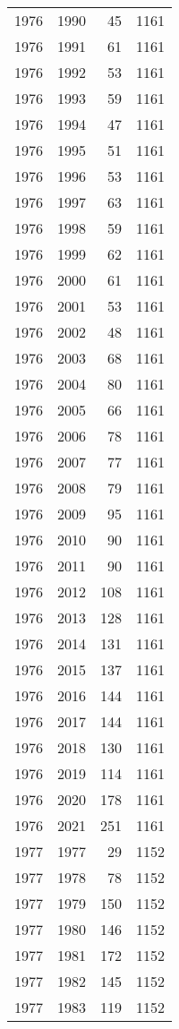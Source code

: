 \documentclass[
  10pt,
  letterpaper,
  DIV=11,
  numbers=noendperiod,
  twoside]{scrartcl}
\begin{document}
\begin{longtable}[]{@{}rrrr@{}}
1976 & 1990 & 45 & 1161 \\
1976 & 1991 & 61 & 1161 \\
1976 & 1992 & 53 & 1161 \\
1976 & 1993 & 59 & 1161 \\
1976 & 1994 & 47 & 1161 \\
1976 & 1995 & 51 & 1161 \\
1976 & 1996 & 53 & 1161 \\
1976 & 1997 & 63 & 1161 \\
1976 & 1998 & 59 & 1161 \\
1976 & 1999 & 62 & 1161 \\
1976 & 2000 & 61 & 1161 \\
1976 & 2001 & 53 & 1161 \\
1976 & 2002 & 48 & 1161 \\
1976 & 2003 & 68 & 1161 \\
1976 & 2004 & 80 & 1161 \\
1976 & 2005 & 66 & 1161 \\
1976 & 2006 & 78 & 1161 \\
1976 & 2007 & 77 & 1161 \\
1976 & 2008 & 79 & 1161 \\
1976 & 2009 & 95 & 1161 \\
1976 & 2010 & 90 & 1161 \\
1976 & 2011 & 90 & 1161 \\
1976 & 2012 & 108 & 1161 \\
1976 & 2013 & 128 & 1161 \\
1976 & 2014 & 131 & 1161 \\
1976 & 2015 & 137 & 1161 \\
1976 & 2016 & 144 & 1161 \\
1976 & 2017 & 144 & 1161 \\
1976 & 2018 & 130 & 1161 \\
1976 & 2019 & 114 & 1161 \\
1976 & 2020 & 178 & 1161 \\
1976 & 2021 & 251 & 1161 \\
1977 & 1977 & 29 & 1152 \\
1977 & 1978 & 78 & 1152 \\
1977 & 1979 & 150 & 1152 \\
1977 & 1980 & 146 & 1152 \\
1977 & 1981 & 172 & 1152 \\
1977 & 1982 & 145 & 1152 \\
1977 & 1983 & 119 & 1152 \\

\end{longtable}
\end{document}
